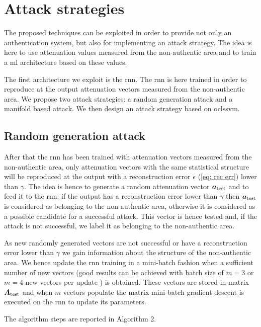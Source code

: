 \documentclass[draftcls,onecolumn,12pt]{IEEEtran}
\begin{document}
\section{Attack strategies}
\label{sec:attack}
The proposed techniques can be exploited in order to provide not only an authentication system, but also for implementing an attack strategy. The idea is here to use attenuation values measured from the non-authentic area and to train a \ac{ml} architecture based on these values.

The first architecture we exploit is the \ac{rnn}. The \ac{rnn} is here trained in order to reproduce at the output attenuation vectors measured from the non-authentic area. We propose two attack strategies: a random generation attack and a manifold based attack. We then design an attack strategy based on \ac{oclssvm}.

\subsection{Random generation attack}
After that the \ac{rnn} has been trained with attenuation vectors measured from the non-authentic area, only attenuation vectors with the same statistical structure will be reproduced at the output with a reconstruction error $\epsilon$ (\ref{eq: rec err}) lower than $\gamma$. The idea is hence to generate a random attenuation vector $\bm{a}_{\rm test}$ and to feed it to the \ac{rnn}: if the output has a reconstruction error lower than $\gamma$ then $\bm{a}_{\rm test}$ is considered as belonging to the non-authentic area, otherwise it is considered as a possible candidate for a successful attack. This vector is hence tested and, if the attack is not successful, we label it as belonging to the non-authentic area.

As new randomly generated vectors are not successful or have a reconstruction error lower than $\gamma$ we gain information about the structure of the non-authentic area. We hence update the \ac{rnn} training in a mini-batch fashion when a sufficient number of new vectors (good results can be achieved with batch size of $m=3$ or $m=4$ new vectors per update \cite{bengio-12}) is obtained. These vectors are stored in matrix $\bm{A}_{\rm test}$ and when $m$ vectors populate the matrix mini-batch gradient descent is executed on the \ac{rnn} to update its parameters.

The algorithm steps are reported in Algorithm 2.
\end{document}
